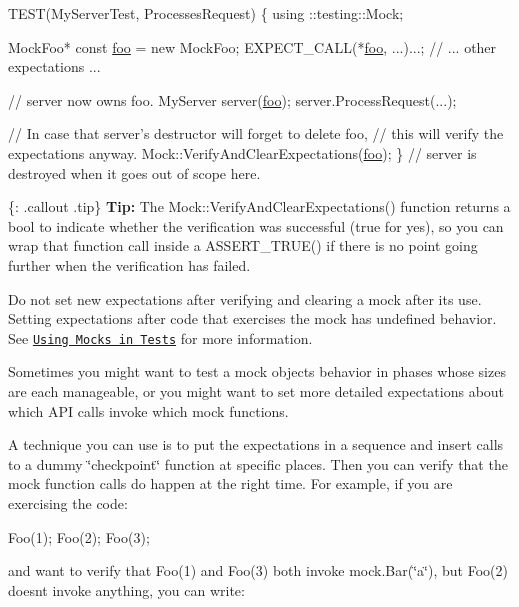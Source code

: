 \begin{DoxyCode}
TEST(MyServerTest, ProcessesRequest) \{
  using ::testing::Mock;

  MockFoo* \textcolor{keyword}{const} \mbox{\hyperlink{namespacefoo}{foo}} = \textcolor{keyword}{new} MockFoo;
  EXPECT\_CALL(*\mbox{\hyperlink{namespacefoo}{foo}}, ...)...;
  \textcolor{comment}{// ... other expectations ...}

  \textcolor{comment}{// server now owns foo.}
  MyServer server(\mbox{\hyperlink{namespacefoo}{foo}});
  server.ProcessRequest(...);

  \textcolor{comment}{// In case that server's destructor will forget to delete foo,}
  \textcolor{comment}{// this will verify the expectations anyway.}
  Mock::VerifyAndClearExpectations(\mbox{\hyperlink{namespacefoo}{foo}});
\}  \textcolor{comment}{// server is destroyed when it goes out of scope here.}
\end{DoxyCode}


\{\+: .callout .tip\} {\bfseries Tip\+:} The {\ttfamily Mock\+::\+Verify\+And\+Clear\+Expectations()} function returns a {\ttfamily bool} to indicate whether the verification was successful ({\ttfamily true} for yes), so you can wrap that function call inside a {\ttfamily A\+S\+S\+E\+R\+T\+\_\+\+T\+R\+U\+E()} if there is no point going further when the verification has failed.

Do not set new expectations after verifying and clearing a mock after its use. Setting expectations after code that exercises the mock has undefined behavior. See \href{gmock_for_dummies.md#using-mocks-in-tests}{\tt Using Mocks in Tests} for more information.

Sometimes you might want to test a mock object\textquotesingle{}s behavior in phases whose sizes are each manageable, or you might want to set more detailed expectations about which A\+PI calls invoke which mock functions.

A technique you can use is to put the expectations in a sequence and insert calls to a dummy \char`\"{}checkpoint\char`\"{} function at specific places. Then you can verify that the mock function calls do happen at the right time. For example, if you are exercising the code\+:


\begin{DoxyCode}
Foo(1);
Foo(2);
Foo(3);
\end{DoxyCode}


and want to verify that {\ttfamily Foo(1)} and {\ttfamily Foo(3)} both invoke {\ttfamily mock.\+Bar(\char`\"{}a\char`\"{})}, but {\ttfamily Foo(2)} doesn\textquotesingle{}t invoke anything, you can write\+:


